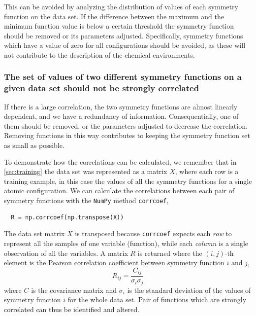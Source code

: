 \documentclass[twoside,english]{uiofysmaster}
\begin{document}
This can be avoided by analyzing the distribution of values of each symmetry function on the data set. If the difference 
between the maximum and the minimum function value is below a certain threshold
the symmetry function should be removed or its parameters adjusted. Specifically, 
symmetry functions which have a value of zero for all configurations should be avoided, as these will not contribute
to the description of the chemical environments. 

\subsubsection{The set of values of two different symmetry functions on a given data set should not be strongly correlated}
If there is a large correlation, the two symmetry functions are almost linearly dependent, 
and we have a redundancy of information. Consequentially, one of them should be removed, or the parameters adjusted
to decrease the correlation. Removing functions in this way contributes to keeping the symmetry function set as 
small as possible.

To demonstrate how the correlations can be calculated, we remember that in 
\autoref{sec:training} the data set was represented as a matrix $X$, where
each row is a training example, in this case the values of all the symmetry functions for a single atomic configuration.
We can calculate the correlations between each pair of symmetry functions with the \texttt{NumPy} method \texttt{corrcoef}, 
\begin{verbatim}
  R = np.corrcoef(np.transpose(X))
\end{verbatim}
The data set matrix $X$ is transposed because \texttt{corrcoef} expects each \textit{row} to represent all the samples of one
variable (function), while each \textit{column} is a single observation of all the variables.
A matrix $R$ is returned where the $(i,j)$-th element is the Pearson correlation coefficient between 
symmetry function $i$ and $j$,
\begin{equation}
 R_{ij} = \frac{C_{ij}}{\sigma_i\sigma_j}
\end{equation}
where $C$ is the covariance matrix and $\sigma_i$ is the standard deviation of the values of symmetry function $i$ for 
the whole data set. Pair of functions which are strongly correlated can thus be identified and altered.
\end{document}
